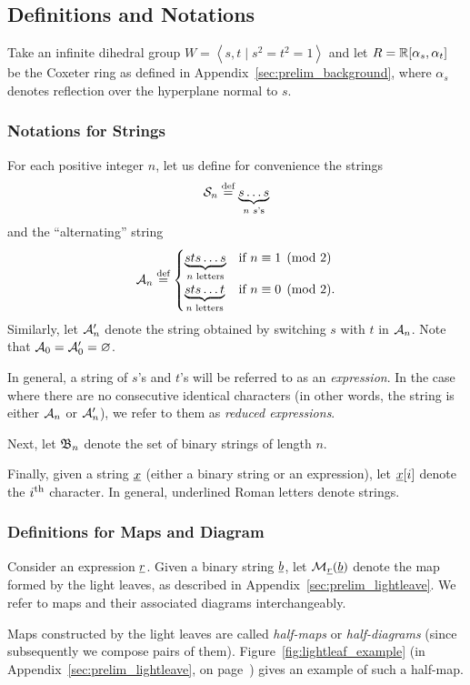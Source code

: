\subsection{Definitions and Notations}
\label{sec:prelim_def_notation}
Take an infinite dihedral group $W=\left<s,t\mid s^2=t^2=1\right>$ and let $R = \RR[\alpha_s, \alpha_t]$ be the Coxeter ring as defined in Appendix~\ref{sec:prelim_background}, where $\alpha_s$ denotes reflection over the hyperplane normal to $s$.  
\subsubsection{Notations for Strings}
For each positive integer $n$, let us define for convenience the strings
\[ \SS_n \defeq \underbrace{s \dots s}_{\text{$n$ $s$'s}} \] 
and the ``alternating'' string
\[
	\AA_n \defeq
	\begin{cases}
		\underbrace{sts\dots s}_{\text{$n$ letters}} & \text{if } n \equiv 1 \pmod{2} \\
		\underbrace{sts\dots t}_{\text{$n$ letters}} & \text{if } n \equiv 0 \pmod{2}. 
	\end{cases}
\]
Similarly, let $\AA_n'$ denote the string obtained by switching $s$ with $t$ in $\AA_n$.  Note that $\AA_0 = \AA_0' = \varnothing$.

In general, a string of $s$'s and $t$'s will be referred to as an \emph{expression}.  In the case where there are no consecutive identical characters (in other words, the string is either $\AA_n$ or $\AA_n'$), we refer to them as \emph{reduced expressions}.

Next, let $\BB_n$ denote the set of binary strings of length $n$.

Finally, given a string $\ul x$ (either a binary string or an expression), let $\ul x[i]$ denote the $i\th$ character.  In general, underlined Roman letters denote strings.

\subsubsection{Definitions for Maps and Diagram}
Consider an expression $\ul r$.  Given a binary string $\ul b$, let $\MM_{\ul r}(\ul b)$ denote the map formed by the light leaves, as described in Appendix~\ref{sec:prelim_lightleave}.  We refer to maps and their associated diagrams interchangeably.

Maps constructed by the light leaves are called \emph{half-maps} or \emph{half-diagrams} (since subsequently we compose pairs of them).  Figure~\ref{fig:lightleaf_example} (in Appendix~\ref{sec:prelim_lightleave}, on page~\pageref{sec:prelim_lightleave}) gives an example of such a half-map.

